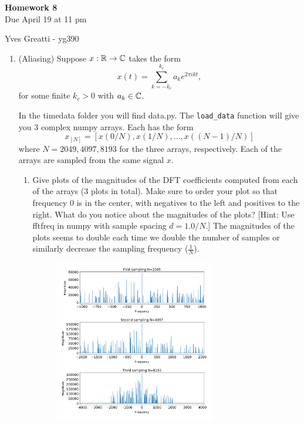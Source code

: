 \documentclass[12pt,twoside]{article}
\begin{document}
\begin{center}
{\large{\textbf{Homework 8}} } \vspace{0.2cm}\\
Due April 19 at 11 pm
\end{center}
Yves Greatti - yg390\\

\begin{enumerate}

 \item (Aliasing) Suppose $x:\mathbb{R}\to\mathbb{C}$ takes the form 
  $$x(t) = \sum_{k=-k_c}^{k_c} a_ke^{2\pi i kt},$$
  for some finite $k_c>0$ with $a_k\in\mathbb{C}$.  

  In the timedata folder you will find data.py.  The 
  \texttt{load\_data} function will give you 3 complex numpy arrays.  Each
  has the form
  $$x_{[N]}=[x(0/N),x(1/N),\ldots,x((N-1)/N)]$$
  where $N=2049,4097,8193$ for the three arrays, respectively.  Each of
  the arrays are sampled from the same signal $x$.
  \begin{enumerate}
  \item Give plots of the magnitudes of the DFT
    coefficients computed from each of the arrays (3 plots in total).
    Make sure to order your plot so
    that frequency 0 is in the center, with negatives to the left
    and positives to the right. What do you notice about the
    magnitudes of the plots?
    [Hint: Use fftfreq in numpy with sample spacing $d=1.0/N$.]
    The magnitudes of the plots seems to double each time we double the number of samples or similarly decrease
    the sampling frequency ($\frac{1}{N}$).
    
	\begin{figure}[H]
		\centering
		\captionsetup{justification=centering}
		\includegraphics[width=200pt]{code/timedata/question_1.pdf}
	\end{figure}
    

\end{enumerate}
\end{enumerate}
\end{document}
